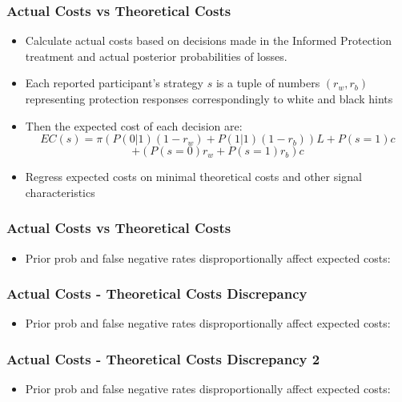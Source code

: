 \documentclass[11pt,hyperref={bookmarks=false}]{beamer}
\begin{document}
\begin{frame}
\frametitle{Actual Costs vs Theoretical Costs}
\begin{itemize}
\item Calculate actual costs based on decisions made in the Informed Protection treatment and actual posterior probabilities of losses.
\item Each reported participant's strategy $s$ is a tuple of numbers $(r_w,r_b)$ representing protection responses correspondingly to white and black hints
\item Then the expected cost of each decision are:
\small
$$EC(s)=\pi (P(0|1)(1-r_w)+P(1|1)(1-r_b))L+P(s=1)c$$
$$+(P(s=0)r_w+P(s=1)r_b)c$$
\normalsize
\item Regress expected costs on minimal theoretical costs and other signal characteristics
\end{itemize}
\end{frame}


\begin{frame}
\frametitle{Actual Costs vs Theoretical Costs}
\begin{itemize}
\item Prior prob and false negative rates disproportionally affect expected costs:
\end{itemize}
\footnotesize

\end{frame}

\begin{frame}
\frametitle{Actual Costs - Theoretical Costs Discrepancy}
\begin{itemize}
\item Prior prob and false negative rates disproportionally affect expected costs:
\end{itemize}
\footnotesize

\end{frame}


\begin{frame}
\frametitle{Actual Costs - Theoretical Costs Discrepancy 2}
\begin{itemize}
\item Prior prob and false negative rates disproportionally affect expected costs:
\end{itemize}
\footnotesize

\end{frame}
\end{document}
